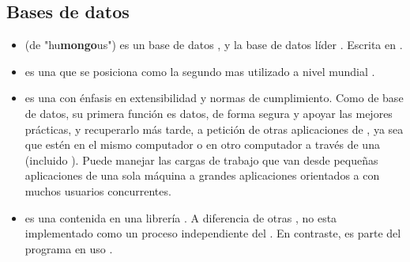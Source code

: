\subsection{Bases de datos}
\begin{itemize}
	\item \textbf{\mongodbNAME} (de "hu\textbf{mongo}us") es un base de datos \documentOriented \openSourcePC, y la base de datos líder \nosql. Escrita en \cPlusPlus \cite{technology_mongodb}.
	
	\item \textbf{\mysql} es una \rdbms \openSourcePC que se posiciona como la  segundo mas utilizado a nivel mundial \cite{online_db_engines_ranking}\cite{online_dispelling_myths}.
	
	\item \textbf{\postgresql} es una \ordbms con énfasis en extensibilidad y normas de cumplimiento. Como \serverAS de base de datos, su primera función es \store datos, de forma segura y apoyar las mejores prácticas, y recuperarlo más tarde, a petición de otras aplicaciones de \software, ya sea que estén \running en el mismo computador o \running en otro computador a través  de una \network (incluido \internet). Puede manejar las cargas de trabajo que van desde pequeñas aplicaciones de una sola máquina a grandes aplicaciones orientados a \internet con muchos usuarios concurrentes.
	
	\item \textbf{\sqlite} es una \rdbms contenida en una librería \cprogramming. A diferencia de otras \dbmangesystem, \sqlite no esta implementado como un proceso independiente del \clientAS. En contraste, es parte del programa en uso \cite{online_video_introduction_sqlite}.
\end{itemize}

